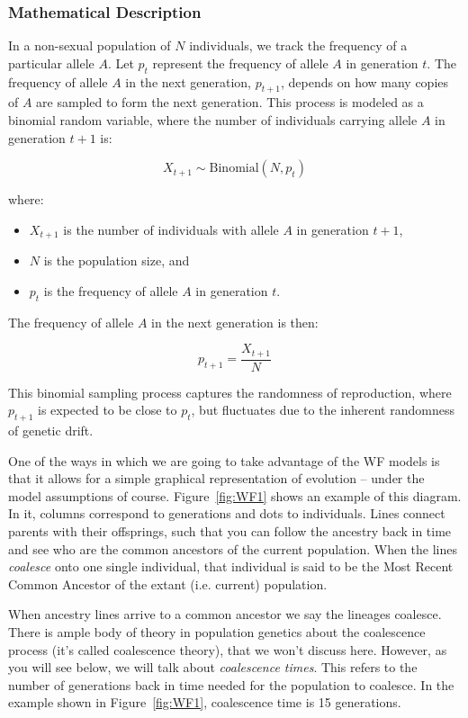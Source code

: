 \documentclass[10pt,a4paper]{scrbook}
\begin{document}
\subsubsection{Mathematical Description}

In a non-sexual population of \(N\) individuals, we track the frequency of a particular allele \(A\). Let \(p_t\) represent the frequency of allele \(A\) in generation \(t\). The frequency of allele \(A\) in the next generation, \(p_{t+1}\), depends on how many copies of \(A\) are sampled to form the next generation. This process is modeled as a binomial random variable, where the number of individuals carrying allele \(A\) in generation \(t+1\) is:

\begin{equation}
X_{t+1} \sim \text{Binomial}(N, p_t)
\end{equation}

where:
\begin{itemize}
    \item \(X_{t+1}\) is the number of individuals with allele \(A\) in generation \(t+1\),
    \item \(N\) is the population size, and
    \item \(p_t\) is the frequency of allele \(A\) in generation \(t\).
\end{itemize}

The frequency of allele \(A\) in the next generation is then:

\begin{equation}
p_{t+1} = \frac{X_{t+1}}{N}
\end{equation}

This binomial sampling process captures the randomness of reproduction, where \(p_{t+1}\) is expected to be close to \(p_t\), but fluctuates due to the inherent randomness of genetic drift.

One of the ways in which we are going to take advantage of the WF models is that it allows for a simple graphical representation of evolution – under the model assumptions of course. Figure~\ref{fig:WF1} shows an example of this diagram. In it, columns correspond to generations and dots to individuals. Lines connect parents with their offsprings, such that you can follow the ancestry back in time and see who are the common ancestors of the current population. When the lines \emph{coalesce} onto one single individual, that individual is said to be the Most Recent Common Ancestor of the extant (i.e. current) population. 

When ancestry lines arrive to a common ancestor we say the lineages coalesce. There is ample body of theory in population genetics about the coalescence process (it's called coalescence theory), that we won't discuss here. However, as you will see below, we will talk about \emph{coalescence times}. This refers to the number of generations back in time needed for the population to coalesce. In the example shown in Figure~\ref{fig:WF1}, coalescence time is 15 generations.
\end{document}

